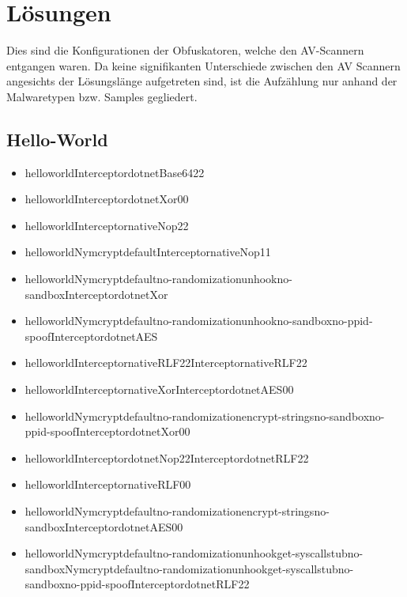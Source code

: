 \chapter{Lösungen}
Dies sind die Konfigurationen der Obfuskatoren, welche den AV-Scannern entgangen waren. Da keine signifikanten Unterschiede zwischen den AV Scannern angesichts der Lösungslänge aufgetreten sind, ist die Aufzählung nur anhand der Malwaretypen bzw. Samples gegliedert.

\section{Hello-World}
\begin{itemize}
\item helloworldInterceptordotnetBase6422
\item helloworldInterceptordotnetXor00
\item helloworldInterceptornativeNop22
\item helloworldNymcryptdefaultInterceptornativeNop11
\item helloworldNymcryptdefault\-no-randomization\-unhookno-sandbox\-InterceptordotnetXor
\item helloworldNymcryptdefaultno-randomizationunhookno-sandboxno-ppid-spoofInterceptordotnetAES
\item helloworldInterceptornativeRLF22\-InterceptornativeRLF22
\item helloworldInterceptor\-nativeXorInterceptordotnetAES00
\item helloworldNymcryptdefaultno-randomizationencrypt-stringsno-sandboxno-ppid-spoof\-InterceptordotnetXor00
\item helloworld\-InterceptordotnetNop22\-InterceptordotnetRLF22
\item helloworldInterceptornativeRLF00
\item helloworldNymcryptdefaultno-randomization\-encrypt-stringsno-sandbox\-InterceptordotnetAES00
\item helloworldNymcryptdefaultno-randomizationunhookget-syscallstubno-sandbox\-Nymcryptdefaultno-randomizationunhookget\--syscallstubno\--sandboxno-ppid-spoof\-InterceptordotnetRLF22
\end{itemize}

